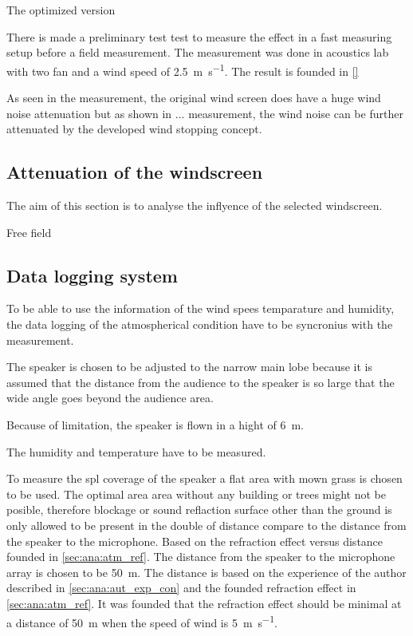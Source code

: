 The optimized version



There is made a preliminary test test to measure the effect in a fast measuring setup before a field measurement. The measurement was done in acoustics lab with two fan and a wind speed of \SI{2.5}{\meter\per\second}. The result is founded in \autoref{}




As seen in the measurement, the original wind screen does have a huge wind noise attenuation but as shown in ... measurement, the wind noise can be further attenuated by the developed wind stopping concept. 




\subsection{Attenuation of the windscreen} 
The aim of this section is to analyse the inflyence of the selected windscreen. 

Free field 



\subsection{Data logging system} 

To be able to use the information of the wind spees temparature and humidity, the data logging of the atmospherical condition have to be syncronius with the measurement. 


The speaker is chosen to be adjusted to the narrow main lobe because it is assumed that the distance from the audience to the speaker is so large that the wide angle goes beyond the audience area.

Because of limitation, the speaker is flown in a hight of \SI{6}{\meter}. 

The humidity and temperature have to be measured.

To measure the \gls{spl} coverage of the speaker a flat area with mown grass is chosen to be used. The optimal area area without any building or trees might not be posible, therefore blockage or sound reflaction surface other than the ground is only allowed to be present in the double of distance compare to the distance from the speaker to the microphone. Based on the refraction effect versus distance founded in \autoref{sec:ana:atm_ref}. The distance from the speaker to the microphone array is chosen to be \SI{50}{\meter}. The distance is based on the experience of the author described in \autoref{sec:ana:aut_exp_con} and the founded refraction effect in \autoref{sec:ana:atm_ref}. It was founded that the refraction effect should be minimal at a distance of \SI{50}{\meter} when the speed of wind is \SI{5}{\meter\per\second}. 


